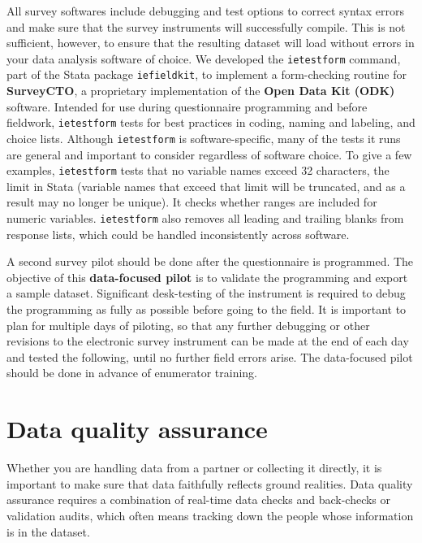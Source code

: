 All survey softwares include debugging and test options
to correct syntax errors and make sure that the survey instruments will successfully compile.
This is not sufficient, however, to ensure that the resulting dataset
will load without errors in your data analysis software of choice.
We developed the \texttt{ietestform} command,
part of the Stata package \texttt{iefieldkit},
to implement a form-checking routine for \textbf{SurveyCTO},
a proprietary implementation of the \textbf{Open Data Kit (ODK)} software.
Intended for use during questionnaire programming and before fieldwork,
\texttt{ietestform} tests for best practices in coding, naming and labeling, and choice lists.
Although \texttt{ietestform} is software-specific,
many of the tests it runs are general and important to consider regardless of software choice.
To give a few examples, \texttt{ietestform} tests that no variable names exceed
32 characters, the limit in Stata (variable names that exceed that limit will
be truncated, and as a result may no longer be unique).
It checks whether ranges are included for numeric variables.
\texttt{ietestform} also removes all leading and trailing blanks from response lists,
which could be handled inconsistently across software.

A second survey pilot should be done after the questionnaire is programmed.
The objective of this \textbf{data-focused pilot}
is to validate the programming and export a sample dataset.
Significant desk-testing of the instrument is required to debug the programming
as fully as possible before going to the field.
It is important to plan for multiple days of piloting,
so that any further debugging or other revisions to the electronic survey instrument
can be made at the end of each day and tested the following, until no further field errors arise.
The data-focused pilot should be done in advance of enumerator training.

\section{Data quality assurance}

Whether you are handling data from a partner or collecting it directly,
it is important to make sure that data faithfully reflects ground realities.
Data quality assurance requires a combination of real-time data checks
and back-checks or validation audits, which often means tracking down
the people whose information is in the dataset.


